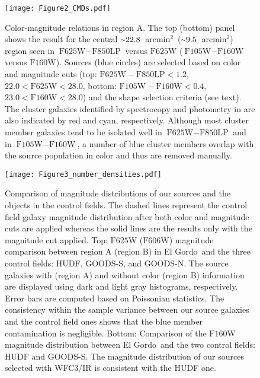 \documentclass[twocolumn]{aastex631}
\newcommand{\elgordo}{El Gordo}
\newcommand{\mytilde}{\raise.19ex\hbox{$\scriptstyle\sim$}}
\newcommand{\sqarcmin}{arcmin$^{2}$}
\begin{document}
\begin{figure}
\centering
\texttt{[image: Figure2\_CMDs.pdf]}
\caption{Color-magnitude relations in region A. 
The top (bottom) panel shows the result for the central $\mytilde22.8$~\sqarcmin~($\mytilde9.5$~\sqarcmin) region seen in $\mbox{F625W}-\mbox{F850LP}$ versus $\mbox{F625W}$ ($\mbox{F105W}-\mbox{F160W}$ versus $\mbox{F160W}$). 
Sources (blue circles) are selected based on color and magnitude cuts (top: $\mbox{F625W}-\mbox{F850LP}< 1.2$, $22.0 < \mbox{F625W} < 28.0$,
bottom: $\mbox{F105W}-\mbox{F160W}< 0.4$, $23.0 < \mbox{F160W} < 28.0$) and the shape selection criteria (see text). 
The cluster galaxies identified by spectrocopy and photometry in \cite{Menanteau2012} are also indicated by red and cyan, respectively. 
Although most cluster member galaxies tend to be isolated well in $\mbox{F625W}-\mbox{F850LP}$ and in $\mbox{F105W}-\mbox{F160W}$, a number of blue cluster members overlap with the source population in color and thus are removed manually. }
\label{fig:cmd}
\end{figure}




\begin{figure}
\centering
\texttt{[image: Figure3\_number\_densities.pdf]}
\caption{Comparison of magnitude distributions of our sources and the objects in the control fields.
The dashed lines represent the control field galaxy magnitude distribution after both color and magnitude cuts are applied whereas the solid lines are the results only with the magnitude cut applied. 
Top: $\mbox{F625W}$ ($\mbox{F606W}$) magnitude comparison between region A (region B) in \elgordo~and the three control fields: HUDF, GOODS-S, and GOODS-N. The source galaxies with (region A) and without color (region B) information are displayed using dark and light gray histograms, respectively. Error bars are computed based on Poissonian statistics. The consistency within the sample variance between our source galaxies and the control field ones shows that the blue member contamination is negligible. 
Bottom: Comparison of the $\mbox{F160W}$ magnitude distribution between \elgordo~and the two control fields: HUDF and GOODS-S. The magnitude distribution of our sources selected with WFC3/IR is consistent with the HUDF one. }
\label{fig:mag_distribution}
\end{figure}
\end{document}
